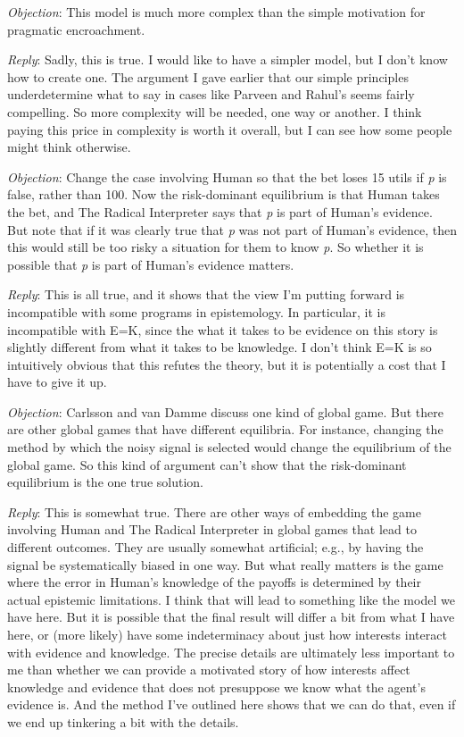 \documentclass[
  11pt,
  letterpaper,
  DIV=11,
  numbers=noendperiod,
  twoside]{scrartcl}
\begin{document}
\emph{Objection}: This model is much more complex than the simple
motivation for pragmatic encroachment.

\emph{Reply}: Sadly, this is true. I would like to have a simpler model,
but I don't know how to create one. The argument I gave earlier that our
simple principles underdetermine what to say in cases like Parveen and
Rahul's seems fairly compelling. So more complexity will be needed, one
way or another. I think paying this price in complexity is worth it
overall, but I can see how some people might think otherwise.

\emph{Objection}: Change the case involving Human so that the bet loses
15 utils if \emph{p} is false, rather than 100. Now the risk-dominant
equilibrium is that Human takes the bet, and The Radical Interpreter
says that \emph{p} is part of Human's evidence. But note that if it was
clearly true that \emph{p} was not part of Human's evidence, then this
would still be too risky a situation for them to know \emph{p}. So
whether it is possible that \emph{p} is part of Human's evidence
matters.

\emph{Reply}: This is all true, and it shows that the view I'm putting
forward is incompatible with some programs in epistemology. In
particular, it is incompatible with E=K, since the what it takes to be
evidence on this story is slightly different from what it takes to be
knowledge. I don't think E=K is so intuitively obvious that this refutes
the theory, but it is potentially a cost that I have to give it up.

\emph{Objection}: Carlsson and van Damme discuss one kind of global
game. But there are other global games that have different equilibria.
For instance, changing the method by which the noisy signal is selected
would change the equilibrium of the global game. So this kind of
argument can't show that the risk-dominant equilibrium is the one true
solution.

\emph{Reply}: This is somewhat true. There are other ways of embedding
the game involving Human and The Radical Interpreter in global games
that lead to different outcomes. They are usually somewhat artificial;
e.g., by having the signal be systematically biased in one way. But what
really matters is the game where the error in Human's knowledge of the
payoffs is determined by their actual epistemic limitations. I think
that will lead to something like the model we have here. But it is
possible that the final result will differ a bit from what I have here,
or (more likely) have some indeterminacy about just how interests
interact with evidence and knowledge. The precise details are ultimately
less important to me than whether we can provide a motivated story of
how interests affect knowledge and evidence that does not presuppose we
know what the agent's evidence is. And the method I've outlined here
shows that we can do that, even if we end up tinkering a bit with the
details.
\end{document}
